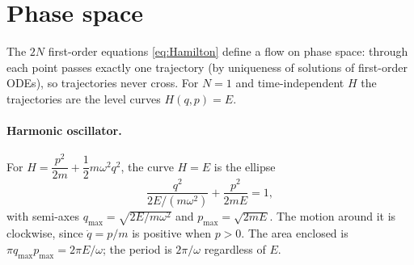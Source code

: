 \documentclass[11pt]{article}
\begin{document}
\section{Phase space}

The $2N$ first-order equations \eqref{eq:Hamilton} define a flow on phase space: through each point passes exactly one trajectory (by uniqueness of solutions of first-order ODEs), so trajectories never cross. For $N=1$ and time-independent $H$ the trajectories are the level curves $H(q,p)=E$.

\paragraph{Harmonic oscillator.} For $H=\dfrac{p^2}{2m}+\dfrac12m\omega^2q^2$, the curve $H=E$ is the ellipse
\begin{equation}
 \frac{q^2}{2E/(m\omega^2)}+\frac{p^2}{2mE}=1 ,
\end{equation}
with semi-axes $q_{\max}=\sqrt{2E/m\omega^2}$ and $p_{\max}=\sqrt{2mE}$. The motion around it is clockwise, since $\dot q=p/m$ is positive when $p>0$. The area enclosed is $\pi q_{\max}p_{\max}=2\pi E/\omega$; the period is $2\pi/\omega$ regardless of $E$.

\begin{center}
\end{center}
\end{document}
